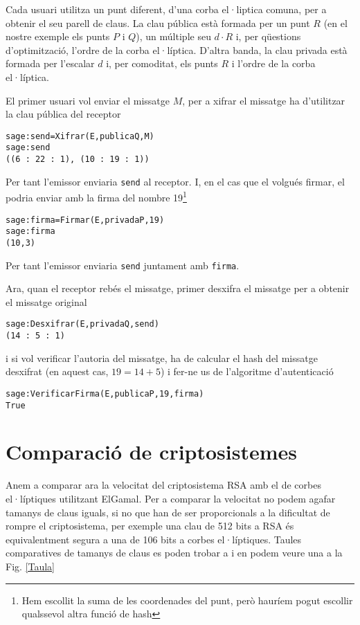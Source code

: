 \documentclass[journal]{IEEEtran}
\begin{document}
Cada usuari utilitza un punt diferent, d'una corba el·liptica comuna, per a obtenir el seu parell de claus. La clau pública està formada per un punt $R$ (en el nostre exemple els punts $P$ i $Q$), un múltiple seu $d \cdot R$ i, per qüestions d'optimització, l'ordre de la corba el·líptica. D'altra banda, la clau privada està formada per l'escalar $d$ i, per comoditat, els punts $R$ i l'ordre de la corba el·líptica.

El primer usuari vol enviar el missatge $M$, per a xifrar el missatge ha d'utilitzar la clau pública del receptor
\begin{scriptsize}
\begin{verbatim}
sage:send=Xifrar(E,publicaQ,M)
sage:send
((6 : 22 : 1), (10 : 19 : 1))
\end{verbatim}
\end{scriptsize}
Per tant l'emissor enviaria \texttt{send} al receptor. I, en el cas que el volgués firmar, el podria enviar amb la firma del nombre 19\footnote{Hem escollit la suma de les coordenades del punt, però hauríem pogut escollir qualssevol altra funció de hash}
\begin{scriptsize}
\begin{verbatim}
sage:firma=Firmar(E,privadaP,19)
sage:firma
(10,3)
\end{verbatim}
\end{scriptsize}
Per tant l'emissor enviaria \texttt{send} juntament amb \texttt{firma}. 

Ara, quan el receptor rebés el missatge, primer desxifra el missatge per a obtenir el missatge original
\begin{scriptsize}
\begin{verbatim}
sage:Desxifrar(E,privadaQ,send)
(14 : 5 : 1)
\end{verbatim}
\end{scriptsize}
i si vol verificar l'autoria del missatge, ha de calcular el hash del missatge desxifrat (en aquest cas, $19 = 14 + 5$) i fer-ne us de l'algoritme d'autenticació
\begin{scriptsize}
\begin{verbatim}
sage:VerificarFirma(E,publicaP,19,firma)
True
\end{verbatim}
\end{scriptsize}
\section{Comparació de criptosistemes}
Anem a comparar ara la velocitat del criptosistema RSA amb el de corbes el·líptiques utilitzant ElGamal.  Per a comparar la velocitat no podem agafar tamanys de claus iguals, si no que han de ser proporcionals a la dificultat de rompre el criptosistema, per exemple una clau de 512 bits a RSA és equivalentment segura a una de 106 bits a corbes el·líptiques. Taules comparatives de tamanys de claus es poden trobar a \cite{EUROCRYPT91} i en podem veure una a la Fig. \ref{Taula}
\end{document}
